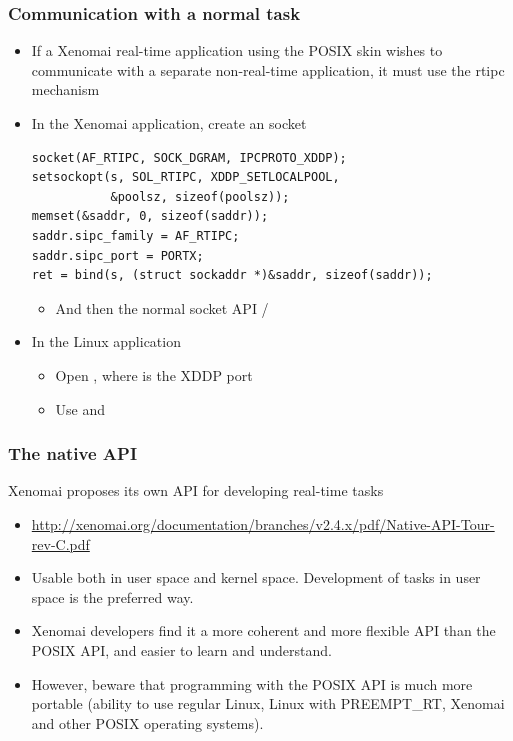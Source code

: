 \begin{frame}[fragile]
  \frametitle{Communication with a normal task}
  \begin{itemize}
  \item If a Xenomai real-time application using the POSIX skin wishes
    to communicate with a separate non-real-time application, it must
    use the rtipc mechanism
  \item In the Xenomai application, create an 
    socket
    \begin{block}{}
\footnotesize
\begin{verbatim}
socket(AF_RTIPC, SOCK_DGRAM, IPCPROTO_XDDP);
setsockopt(s, SOL_RTIPC, XDDP_SETLOCALPOOL,
           &poolsz, sizeof(poolsz));
memset(&saddr, 0, sizeof(saddr));
saddr.sipc_family = AF_RTIPC;
saddr.sipc_port = PORTX;
ret = bind(s, (struct sockaddr *)&saddr, sizeof(saddr));
\end{verbatim}
\normalsize
    \end{block}
    \begin{itemize}
    \item And then the normal socket API  / 
    \end{itemize}
  \item In the Linux application
    \begin{itemize}
    \item Open , where  is the XDDP
      port
    \item Use  and 
    \end{itemize}
  \end{itemize}
\end{frame}

\begin{frame}[fragile]
  \frametitle{The native API}
  Xenomai proposes its own API for developing real-time tasks
  \begin{itemize}
  \item {\small
    \url{http://xenomai.org/documentation/branches/v2.4.x/pdf/Native-API-Tour-rev-C.pdf}}
  \item Usable both in user space and kernel space. Development of
    tasks in user space is the preferred way.
  \item Xenomai developers find it a more coherent and more flexible API
    than the POSIX API, and easier to learn and understand.
  \item However, beware that programming with the POSIX API is much
    more portable (ability to use regular Linux, Linux with PREEMPT\_RT, Xenomai
    and other POSIX operating systems).
  \end{itemize}
\end{frame}

